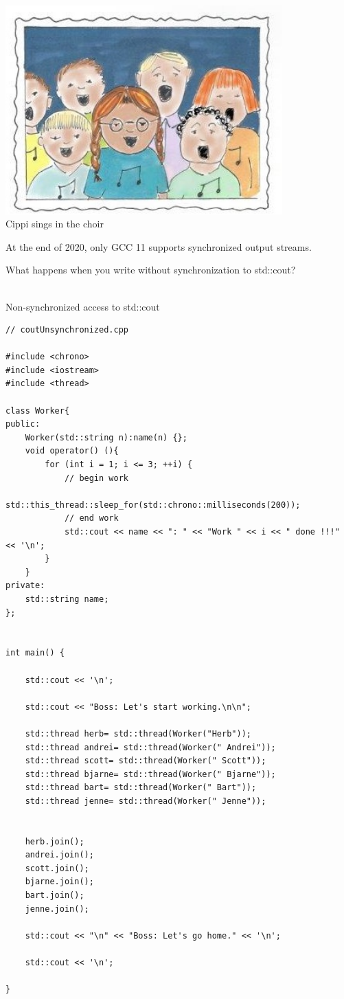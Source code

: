 \begin{center}
\includegraphics[width=0.8\textwidth]{content/3/chapter6/images/28.png}\\
Cippi sings in the choir
\end{center}


\begin{tcolorbox}[colback=blue!5!white,colframe=blue!75!black,title={Compiler Support for Synchronized Output Streams}]
	
At the end of 2020, only GCC 11 supports synchronized output streams.
	
\end{tcolorbox}

What happens when you write without synchronization to std::cout?

\hspace*{\fill} \\ %
\noindent
Non-synchronized access to std::cout
\begin{lstlisting}[style=styleCXX]
// coutUnsynchronized.cpp

#include <chrono>
#include <iostream>
#include <thread>

class Worker{
public:
	Worker(std::string n):name(n) {};
	void operator() (){
		for (int i = 1; i <= 3; ++i) {
			// begin work
			std::this_thread::sleep_for(std::chrono::milliseconds(200));
			// end work
			std::cout << name << ": " << "Work " << i << " done !!!" << '\n';
		}
	}
private:
	std::string name;
};


int main() {

	std::cout << '\n';
	
	std::cout << "Boss: Let's start working.\n\n";
	
	std::thread herb= std::thread(Worker("Herb"));
	std::thread andrei= std::thread(Worker(" Andrei"));
	std::thread scott= std::thread(Worker(" Scott"));
	std::thread bjarne= std::thread(Worker(" Bjarne"));
	std::thread bart= std::thread(Worker(" Bart"));
	std::thread jenne= std::thread(Worker(" Jenne"));
	
	
	herb.join();
	andrei.join();
	scott.join();
	bjarne.join();
	bart.join();
	jenne.join();
	
	std::cout << "\n" << "Boss: Let's go home." << '\n';
	
	std::cout << '\n';

}
\end{lstlisting}

